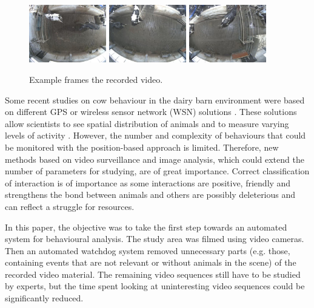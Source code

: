 \documentclass{cta-author}
\begin{document}
\begin{figure}[b]
\begin{center}
  \includegraphics[width=0.3\textwidth]{old-2.jpg}
  \includegraphics[width=0.3\textwidth]{old-1.jpg}
  \includegraphics[width=0.3\textwidth]{old-0.jpg}
\end{center}
  \caption{Example frames the recorded video.}
  \label{fig:old}
\end{figure}


Some recent studies on cow behaviour in the dairy barn environment were based on different GPS or wireless 
sensor network (WSN) solutions \cite{Nadimietal2012}. These solutions allow scientists to see spatial 
distribution of animals and to measure varying levels of activity \cite{Nadimietal2012}. However, the number 
and complexity of behaviours that could be monitored with the position-based approach is limited. Therefore, 
new methods based on video surveillance and image analysis, which could extend the number of parameters for 
studying, are of great importance. Correct classification of interaction is of importance as some 
interactions are positive, friendly and strengthens the bond between animals and others are possibly 
deleterious and can reflect a struggle for resources.

In this paper, the objective was to take the first step towards an automated system for behavioural analysis. 
The study area was filmed using video cameras. Then an automated watchdog system removed unnecessary parts 
(e.g. those, containing events that are not relevant or without animals in the scene) of the recorded video 
material. The remaining video sequences still have to be studied by experts, but the time spent 
looking at uninteresting video sequences could be significantly reduced. 
\end{document}
